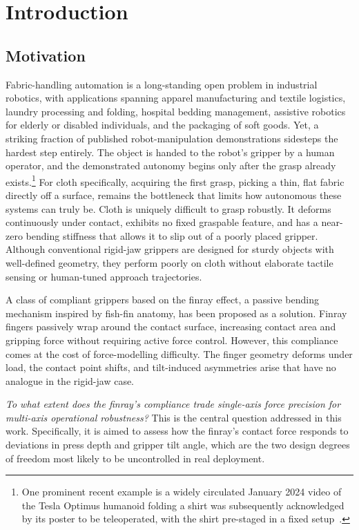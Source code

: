 \chapter{\rm\bfseries Introduction}
\label{ch:introduction}

\section{Motivation}

Fabric-handling automation is a long-standing open problem in industrial
robotics, with applications spanning apparel manufacturing and textile
logistics, laundry processing and folding, hospital bedding management,
assistive robotics for elderly or disabled individuals, and the packaging
of soft goods. Yet, a striking fraction of published robot-manipulation
demonstrations sidesteps the hardest step entirely. The object is handed
to the robot's gripper by a human operator, and the demonstrated
autonomy begins only after the grasp already
exists.\footnote{One prominent recent example is a widely circulated
January 2024 video of the Tesla Optimus humanoid folding a shirt was
subsequently acknowledged by its poster to be teleoperated, with the
shirt pre-staged in a fixed setup~\cite{musk2024optimus,novak2024magic}.} For cloth
specifically, acquiring the first grasp, picking a thin, flat fabric
directly off a surface, remains the bottleneck that limits how
autonomous these systems can truly be. Cloth is uniquely difficult to
grasp robustly. It deforms continuously under contact, exhibits no fixed
graspable feature, and has a near-zero bending stiffness that allows it to slip
out of a poorly placed gripper. Although conventional rigid-jaw grippers are
designed for sturdy objects with well-defined geometry, they perform poorly on
cloth without elaborate tactile sensing or human-tuned approach trajectories.

A class of compliant grippers based on the finray effect, a passive
bending mechanism inspired by fish-fin anatomy, has been proposed as a
solution. Finray fingers passively wrap around the contact surface, increasing
contact area and gripping force without requiring active force control.
However, this compliance comes at the cost of force-modelling difficulty.
The finger geometry deforms under load, the contact point shifts, and
tilt-induced asymmetries arise that have no analogue in the rigid-jaw case.

\emph{To what extent does the finray's compliance trade single-axis force
precision for multi-axis operational robustness?} This is the central
question addressed in this work. Specifically, it is aimed to assess how
the finray's contact force responds to deviations in press depth and
gripper tilt angle, which are the two design degrees of freedom most
likely to be uncontrolled in real deployment.

